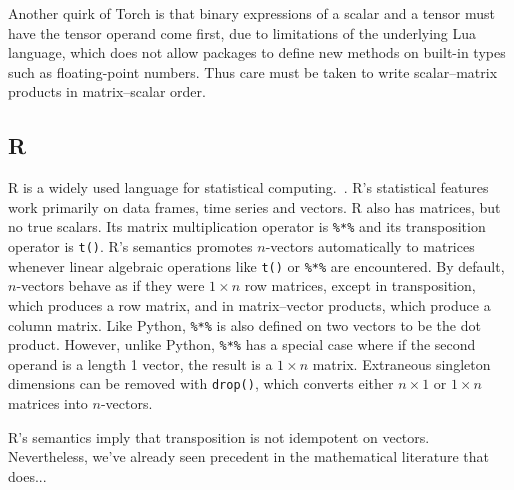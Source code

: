 Another quirk of Torch is that binary expressions of a scalar and a tensor must
have the tensor operand come first, due to limitations of the underlying Lua
language, which does not allow packages to define new methods on built-in
types such as floating-point numbers. Thus care must be taken to write
scalar--matrix products in matrix--scalar order.


\subsection{R}

R is a widely used language for statistical computing.~\cite{Rlang}.
R's statistical features work primarily on data frames, time series and vectors.
R also has matrices, but no true scalars.
Its matrix multiplication operator is \verb|%*%| and its transposition operator
is \verb|t()|.
R's semantics promotes $n$-vectors automatically to matrices whenever linear algebraic
operations like \verb|t()| or \verb|%*%| are encountered.
By default, $n$-vectors behave as if they were $1\times n$ row matrices, except in
transposition, which produces a row matrix, and in matrix--vector products, which
produce a column matrix.
Like Python, \verb|%*%| is also defined on two vectors to be the dot product.
However, unlike Python, \verb|%*%| has a special case where if the second operand
is a length 1 vector, the result is a $1\times n$ matrix.
Extraneous singleton dimensions can be removed with \verb|drop()|, which converts
either $n\times1$ or $1\times n$ matrices into $n$-vectors.

R's semantics imply that transposition is not idempotent on vectors.
Nevertheless, we've already seen precedent in the mathematical literature
that does...
